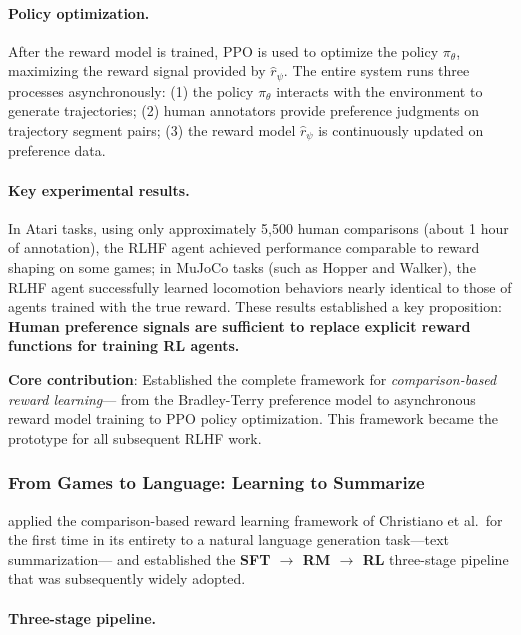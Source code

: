 \paragraph{Policy optimization.}
After the reward model is trained, PPO \cite{schulman2017ppo} is used to optimize the policy $\pi_\theta$,
maximizing the reward signal provided by $\hat{r}_\psi$.
The entire system runs three processes asynchronously:
(1) the policy $\pi_\theta$ interacts with the environment to generate trajectories;
(2) human annotators provide preference judgments on trajectory segment pairs;
(3) the reward model $\hat{r}_\psi$ is continuously updated on preference data.

\paragraph{Key experimental results.}
In Atari tasks, using only approximately 5,500 human comparisons (about 1 hour of annotation),
the RLHF agent achieved performance comparable to reward shaping on some games;
in MuJoCo tasks (such as Hopper and Walker),
the RLHF agent successfully learned locomotion behaviors nearly identical to those of agents trained with the true reward.
These results established a key proposition:
\textbf{Human preference signals are sufficient to replace explicit reward functions for training RL agents.}

\begin{solutionbox}
\textbf{Core contribution}:
Established the complete framework for \textit{comparison-based reward learning}---
from the Bradley-Terry preference model to asynchronous reward model training to PPO policy optimization.
This framework became the prototype for all subsequent RLHF work.
\end{solutionbox}

\subsubsection{From Games to Language: Learning to Summarize}
\label{sec:t2-summarize}

 applied the comparison-based reward learning framework of Christiano et al.\
for the first time in its entirety to a natural language generation task---text summarization---
and established the \textbf{SFT $\rightarrow$ RM $\rightarrow$ RL} three-stage pipeline that was subsequently widely adopted.

\paragraph{Three-stage pipeline.}

